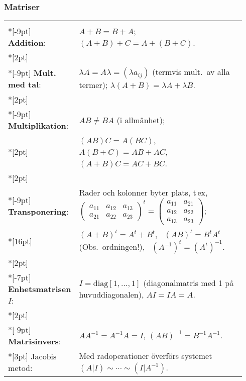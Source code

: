 \documentclass{article}
\begin{document}
\subsubsection*{Matriser}%

\begin{tabular}{|p{0.2\linewidth}|p{0.745\linewidth}|}
  \hline & \\*[-9pt]
  \textbf{Addition}:
  & 
  $A+B=B+A$; \; $(A+B)+C=A+(B+C)$. 
  \\*[2pt]\hline & \\*[-9pt]
  \textbf{Mult. med tal}:
  &
  $\lambda A = A\lambda = (\lambda a_{ij})$ (termvis mult.~av alla termer); \;
  $\lambda(A+B)=\lambda A+\lambda B$.
  \\*[2pt]\hline & \\*[-9pt]
  \textbf{Multiplikation}:
  &
  $AB\ne BA$ (i allmänhet);
  \\*[2pt]
  &$(AB)C=A(BC)$, \ $A(B+C)=AB+AC$, \  $(A+B)C=AC+BC$.
  \\*[2pt]\hline & \\*[-9pt]
  \textbf{Transponering}: &
  Rader och kolonner byter plats, t\,ex, 
  $ \begin{pmatrix}
    a_{11}&a_{12}&a_{13}\\
    a_{21}&a_{22}&a_{23}
  \end{pmatrix}^t
  =
  \begin{pmatrix}
    a_{11}&a_{21}\\a_{12}&a_{22}\\
    a_{13}&a_{23}
  \end{pmatrix}$;
  \\*[16pt]
  &$(A+B)^t=A^t+B^t$, \ 
  $(AB)^t=B^tA^t$ (Obs.~ordningen!), \ 
  $(A^{-1})^t=(A^t)^{-1}$.
  \\*[2pt]\hline  & \\*[-7pt]
  \textbf{Enhetsmatrisen} $I$:
  &
  $I=\mbox{diag}[1,\dots,1]
  $ (diagonalmatris med 1 på huvuddiagonalen), $AI=IA=A$.
  \\*[2pt]\hline & \\*[-9pt]
\textbf{Matrisinvers}:
 &
  $AA^{-1}=A^{-1}A=I$, $(AB)^{-1}=B^{-1}A^{-1}$.\\*[3pt]
  Jacobis metod:
  &
  Med radoperationer överförs systemet $(A|I)\sim \cdots\sim (I|A^{-1})$.

\end{tabular}
\end{document}
